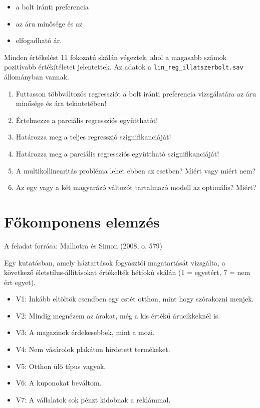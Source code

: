 \documentclass[
  letterpaper,
]{krantz}
\providecommand{\tightlist}{%
  \setlength{\itemsep}{0pt}\setlength{\parskip}{0pt}}\usepackage{longtable,booktabs,array}
\begin{document}
\begin{itemize}
\tightlist
\item
  a bolt iránti preferencia
\item
  az áru minősége és az
\item
  elfogadható ár.
\end{itemize}

Minden értékelést 11 fokozatú skálán végeztek, ahol a magasabb számok
pozitívabb értékítéletet jelentettek. Az adatok a
\texttt{lin\_reg\_illatszerbolt.sav} állományban vannak.

\begin{enumerate}
\def\labelenumi{\arabic{enumi}.}
\item
  Futtasson többváltozós regressziót a bolt iránti preferencia
  vizsgálatára az áru minősége és ára tekintetében!
\item
  Értelmezze a parciális regressziós együtthatót!
\item
  Határozza meg a teljes regresszió szignifikanciáját!
\item
  Határozza meg a parciális regressziós együttható szignifikanciáját!
\item
  A multikollinearitás probléma lehet ebben az esetben? Miért vagy miért
  nem?
\item
  Az egy vagy a két magyarázó változót tartalmazó modell az optimális?
  Miért?
\end{enumerate}

\hypertarget{fux151komponens-elemzuxe9s-1}{%
\chapter{Főkomponens elemzés}\label{fux151komponens-elemzuxe9s-1}}

A feladat forrása: Malhotra és Simon (2008, o. 579)

Egy kutatásban, amely háztartások fogyasztói magatartását vizsgálta, a
következő életstílus-állításokat értékelték hétfokú skálán (1 =
egyetért, 7 = nem ért egyet).

\begin{itemize}
\tightlist
\item
  V1: Inkább eltöltök csendben egy estét otthon, mint hogy szórakozni
  menjek.
\item
  V2: Mindig megnézem az árakat, még a kis értékű árucikkeknél is.
\item
  V3: A magazinok érdekesebbek, mint a mozi.
\item
  V4: Nem vásárolok plakáton hirdetett termékeket.
\item
  V5: Otthon ülő típus vagyok.
\item
  V6: A kuponokat beváltom.
\item
  V7: A vállalatok sok pénzt kidobnak a reklámmal.
\end{itemize}
\end{document}
